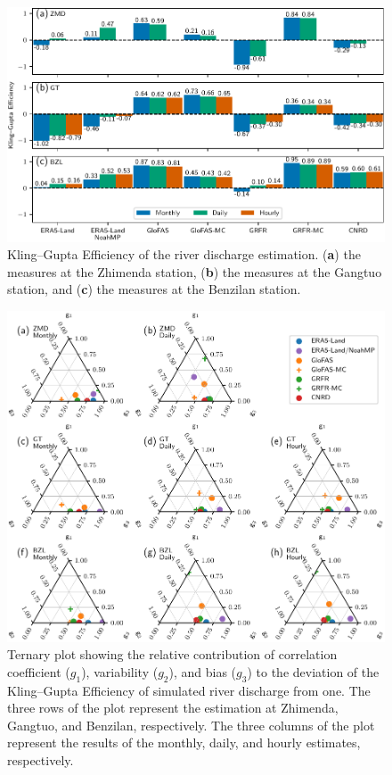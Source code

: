 \documentclass[water,article,submit,pdftex,moreauthors]{Definitions/mdpi}
\begin{document}
\begin{figure}[H]
  \centering
  \includegraphics[width=\textwidth]{streamflow_kge.pdf}
  \caption{Kling--Gupta Efficiency of the river discharge estimation. (\textbf{a}) the measures at the Zhimenda station, (\textbf{b}) the measures at the Gangtuo station, and (\textbf{c}) the measures at the Benzilan station.}
  \label{fig:streamflow_kge}
\end{figure}

\begin{figure}[H]
  \centering
  \includegraphics[width=\textwidth]{streamflow_kge_comp.pdf}
  \caption{Ternary plot showing the relative contribution of correlation coefficient ($g_1$), variability ($g_2$), and bias ($g_3$) to the deviation of the Kling--Gupta Efficiency of simulated river discharge from one. The three rows of the plot represent the estimation at Zhimenda, Gangtuo, and Benzilan, respectively. The three columns of the plot represent the results of the monthly, daily, and hourly estimates, respectively.}
  \label{fig:streamflow_kge_comp}
\end{figure}
\end{document}
